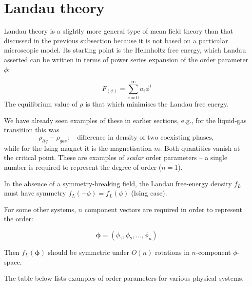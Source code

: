 \documentclass[
  letterpaper,
  enabledeprecatedfontcommands]{report}
\begin{document}
\section{Landau theory}\label{sec-landau-theory}

Landau theory is a slightly more general type of mean field theory than
that discussed in the previous subsection because it is not based on a
particular microscopic model. Its starting point is the Helmholtz free
energy, which Landau asserted can be written in terms of power series
expansion of the order parameter \(\phi\):

\[
F_(\phi)=\sum_{i=0}^{\infty}a_i\phi^i
\] The equilibrium value of \(\rho\) is that which minimises the Landau
free energy.

\begin{tcolorbox}[enhanced jigsaw, leftrule=.75mm, bottomrule=.15mm, toprule=.15mm, colbacktitle=quarto-callout-caution-color!10!white, title=\textcolor{quarto-callout-caution-color}{\faFire}\hspace{0.5em}{A note on order parameters}, breakable, titlerule=0mm, opacitybacktitle=0.6, colback=white, coltitle=black, colframe=quarto-callout-caution-color-frame, bottomtitle=1mm, rightrule=.15mm, toptitle=1mm, left=2mm, opacityback=0, arc=.35mm]

We have already seen examples of these in earlier sections, e.g., for
the liquid-gas transition this was \[
\rho_{liq} - \rho_{gas}: \quad \textrm{difference in density of two coexisting phases},
\] while for the Ising magnet it is the magnetisation \(m\). Both
quantities vanish at the critical point. These are examples of
\emph{scalar} order parameters -- a single number is required to
represent the degree of order (\(n = 1\)).

In the absence of a symmetry-breaking field, the Landau free-energy
density \(f_L\) must have symmetry \(f_L(-\phi) = f_L(\phi)\) (Ising
case).

For some other systems, \(n\) component vectors are required in order to
represent the order:

\[
\boldsymbol{\phi} = (\phi_1, \phi_2, \dots, \phi_n)
\]

Then \(f_L(\boldsymbol{\phi})\) should be symmetric under \(O(n)\)
rotations in \(n\)-component \(\phi\)-space.

The table below lists examples of order parameters for various physical
systems.


\end{tcolorbox}
\end{document}
